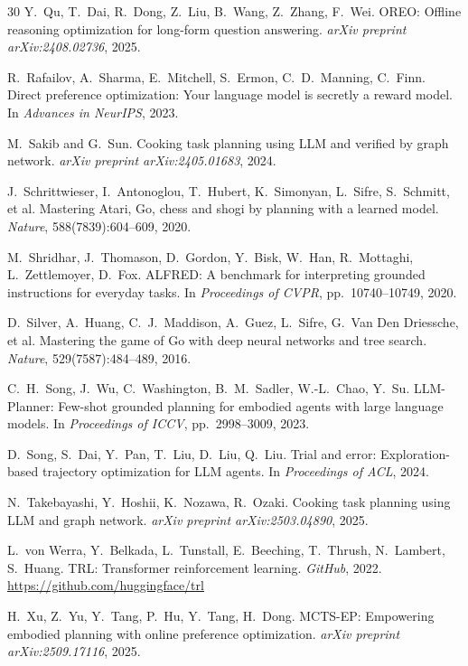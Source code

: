 \documentclass[pdflatex,sn-mathphys-num]{sn-jnl}
\theoremstyle{thmstyleone}
\theoremstyle{thmstyletwo}
\theoremstyle{thmstylethree}
\begin{document}
\begin{thebibliography}{30}
Y.~Qu, T.~Dai, R.~Dong, Z.~Liu, B.~Wang, Z.~Zhang, F.~Wei.
OREO: Offline reasoning optimization for long-form question answering.
\textit{arXiv preprint arXiv:2408.02736}, 2025.

R.~Rafailov, A.~Sharma, E.~Mitchell, S.~Ermon, C.~D.~Manning,
C.~Finn.
Direct preference optimization: Your language model is secretly a
reward model.
In \textit{Advances in NeurIPS}, 2023.

M.~Sakib and G.~Sun.
Cooking task planning using LLM and verified by graph network.
\textit{arXiv preprint arXiv:2405.01683}, 2024.

J.~Schrittwieser, I.~Antonoglou, T.~Hubert, K.~Simonyan, L.~Sifre,
S.~Schmitt, et al.
Mastering Atari, Go, chess and shogi by planning with a learned model.
\textit{Nature}, 588(7839):604--609, 2020.

M.~Shridhar, J.~Thomason, D.~Gordon, Y.~Bisk, W.~Han, R.~Mottaghi,
L.~Zettlemoyer, D.~Fox.
ALFRED: A benchmark for interpreting grounded instructions for everyday
tasks.
In \textit{Proceedings of CVPR}, pp.~10740--10749, 2020.

D.~Silver, A.~Huang, C.~J.~Maddison, A.~Guez, L.~Sifre,
G.~Van Den Driessche, et al.
Mastering the game of Go with deep neural networks and tree search.
\textit{Nature}, 529(7587):484--489, 2016.

C.~H.~Song, J.~Wu, C.~Washington, B.~M.~Sadler, W.-L.~Chao, Y.~Su.
LLM-Planner: Few-shot grounded planning for embodied agents with large
language models.
In \textit{Proceedings of ICCV}, pp.~2998--3009, 2023.

D.~Song, S.~Dai, Y.~Pan, T.~Liu, D.~Liu, Q.~Liu.
Trial and error: Exploration-based trajectory optimization for LLM
agents.
In \textit{Proceedings of ACL}, 2024.

N.~Takebayashi, Y.~Hoshii, K.~Nozawa, R.~Ozaki.
Cooking task planning using LLM and graph network.
\textit{arXiv preprint arXiv:2503.04890}, 2025.

L.~von Werra, Y.~Belkada, L.~Tunstall, E.~Beeching, T.~Thrush,
N.~Lambert, S.~Huang.
TRL: Transformer reinforcement learning.
\textit{GitHub}, 2022.
\url{https://github.com/huggingface/trl}

H.~Xu, Z.~Yu, Y.~Tang, P.~Hu, Y.~Tang, H.~Dong.
MCTS-EP: Empowering embodied planning with online preference
optimization.
\textit{arXiv preprint arXiv:2509.17116}, 2025.


\end{thebibliography}
\end{document}
